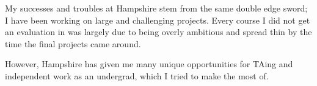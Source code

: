 My successes and troubles at Hampshire stem from the same double edge sword; I
have been working on large and challenging projects.  Every course I did not
get an evaluation in was largely due to being overly ambitious and spread thin
by the time the final projects came around.

However, Hampshire has given me many unique opportunities for TAing and
independent work as an undergrad, which I tried to make the most of.
